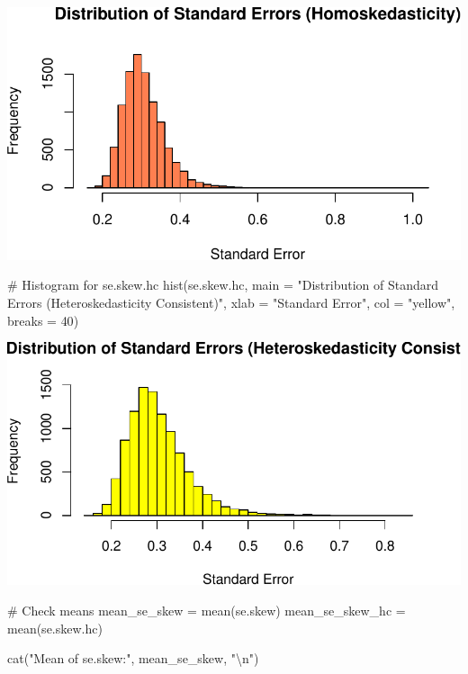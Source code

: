 \documentclass[
  11pt,
]{article}
\newenvironment{Shaded}{\begin{snugshade}}{\end{snugshade}}
\newcommand{\AttributeTok}[1]{\textcolor[rgb]{0.40,0.45,0.13}{#1}}
\newcommand{\CommentTok}[1]{\textcolor[rgb]{0.37,0.37,0.37}{#1}}
\newcommand{\DecValTok}[1]{\textcolor[rgb]{0.68,0.00,0.00}{#1}}
\newcommand{\FunctionTok}[1]{\textcolor[rgb]{0.28,0.35,0.67}{#1}}
\newcommand{\NormalTok}[1]{\textcolor[rgb]{0.00,0.23,0.31}{#1}}
\newcommand{\OtherTok}[1]{\textcolor[rgb]{0.00,0.23,0.31}{#1}}
\newcommand{\SpecialCharTok}[1]{\textcolor[rgb]{0.37,0.37,0.37}{#1}}
\newcommand{\StringTok}[1]{\textcolor[rgb]{0.13,0.47,0.30}{#1}}
\begin{document}
\includegraphics{HW-4-CODE-and-ANSWERS_files/figure-pdf/unnamed-chunk-13-1.pdf}

\begin{Shaded}
\begin{Highlighting}[]
\CommentTok{\# Histogram for se.skew.hc}
\FunctionTok{hist}\NormalTok{(se.skew.hc, }
     \AttributeTok{main =} \StringTok{"Distribution of Standard Errors (Heteroskedasticity Consistent)"}\NormalTok{,}
     \AttributeTok{xlab =} \StringTok{"Standard Error"}\NormalTok{, }\AttributeTok{col =} \StringTok{"yellow"}\NormalTok{, }\AttributeTok{breaks =} \DecValTok{40}\NormalTok{)}
\end{Highlighting}
\end{Shaded}

\includegraphics{HW-4-CODE-and-ANSWERS_files/figure-pdf/unnamed-chunk-13-2.pdf}

\begin{Shaded}
\begin{Highlighting}[]
\CommentTok{\# Check means}
\NormalTok{mean\_se\_skew }\OtherTok{=} \FunctionTok{mean}\NormalTok{(se.skew)}
\NormalTok{mean\_se\_skew\_hc }\OtherTok{=} \FunctionTok{mean}\NormalTok{(se.skew.hc)}

\FunctionTok{cat}\NormalTok{(}\StringTok{"Mean of se.skew:"}\NormalTok{, mean\_se\_skew, }\StringTok{"}\SpecialCharTok{\textbackslash{}n}\StringTok{"}\NormalTok{)}
\end{Highlighting}
\end{Shaded}
\end{document}
